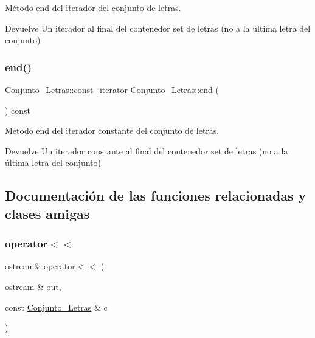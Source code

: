 Método end del iterador del conjunto de letras. 

\begin{DoxyReturn}{Devuelve}
Un iterador al final del contenedor set de letras (no a la última letra del conjunto) 
\end{DoxyReturn}
\mbox{\label{classConjunto__Letras_a1e84b5382d45645267eb8c50884679f1}} 
\subsubsection{\texorpdfstring{end()}{end()}\hspace{0.1cm}{\footnotesize\ttfamily [2/2]}}
{\footnotesize\ttfamily \hyperlink{classConjunto__Letras_a66b252ad22ca76b522ef68fc7e6d09b1}{Conjunto\+\_\+\+Letras\+::const\+\_\+iterator} Conjunto\+\_\+\+Letras\+::end (\begin{DoxyParamCaption}{ }\end{DoxyParamCaption}) const}



Método end del iterador constante del conjunto de letras. 

\begin{DoxyReturn}{Devuelve}
Un iterador constante al final del contenedor set de letras (no a la última letra del conjunto) 
\end{DoxyReturn}


\subsection{Documentación de las funciones relacionadas y clases amigas}
\mbox{\label{classConjunto__Letras_abec73eba28c0f57dc3255e8e53a01e07}} 
\subsubsection{\texorpdfstring{operator$<$$<$}{operator<<}}
{\footnotesize\ttfamily ostream\& operator$<$$<$ (\begin{DoxyParamCaption}\item[{ostream \&}]{out,  }\item[{const \hyperlink{classConjunto__Letras}{Conjunto\+\_\+\+Letras} \&}]{c }\end{DoxyParamCaption})\hspace{0.3cm}{\ttfamily [friend]}}



